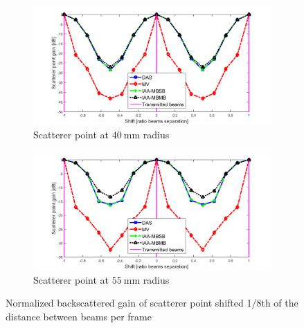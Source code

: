 \begin{figure}[ht]
    \centering
    \begin{subfigure}[t]{\linewidth}
        \includegraphics[width=\linewidth]{./images/results/1/loss_vs_shift_40mm.png}
        \caption{Scatterer point at $40~$mm radius}
    \end{subfigure}
    \quad
    \begin{subfigure}[t]{\linewidth}
        \includegraphics[width=\linewidth]{./images/results/1/loss_vs_shift_55mm.png}
        \caption{Scatterer point at $55~$mm radius}
    \end{subfigure}
	\caption{Normalized backscattered gain of scatterer point shifted 1/8th of the distance between beams per frame}
	\label{fig:loss_vs_shift}
\end{figure}


